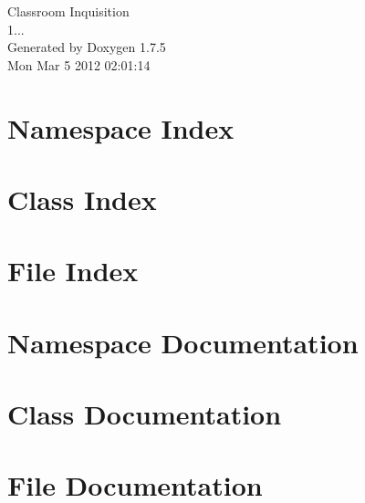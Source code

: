 \documentclass[a4paper]{book}
\begin{document}
\hypersetup{pageanchor=false,citecolor=blue}
\begin{titlepage}
\vspace*{7cm}
\begin{center}
{\Large \-Classroom \-Inquisition \\[1ex]\large 1... }\\
\vspace*{1cm}
{\large \-Generated by Doxygen 1.7.5}\\
\vspace*{0.5cm}
{\small Mon Mar 5 2012 02:01:14}\\
\end{center}
\end{titlepage}
\clearemptydoublepage
{}
\tableofcontents
\clearemptydoublepage
{}
\hypersetup{pageanchor=true,citecolor=blue}
\chapter{\-Namespace \-Index}

\chapter{\-Class \-Index}

\chapter{\-File \-Index}

\chapter{\-Namespace \-Documentation}


\chapter{\-Class \-Documentation}






\chapter{\-File \-Documentation}




















\printindex
\end{document}
